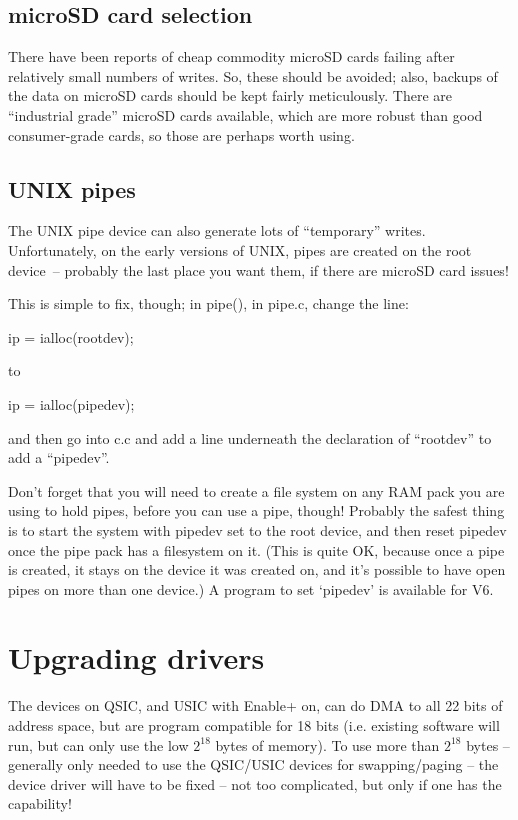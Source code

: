 \subsection{microSD card selection}

There have been reports of cheap commodity microSD cards failing after relatively
small numbers of writes. So, these should be avoided; also, backups of the
data on microSD cards should be kept fairly meticulously. There are ``industrial
grade'' microSD cards available, which are more robust than good consumer-grade
cards, so those are perhaps worth using.

\subsection{UNIX pipes}

The UNIX pipe device can also generate lots of ``temporary'' writes.
Unfortunately, on the early versions of UNIX, pipes are created on the root
device~-- probably the last place you want them, if there are microSD card issues!

This is simple to fix, though; in pipe(), in pipe.c, change the line:

	ip = ialloc(rootdev);

to

	ip = ialloc(pipedev);

and then go into c.c and add a line underneath the declaration of ``rootdev''
to add a ``pipedev''.

Don't forget that you will need to create a file system on any RAM pack you
are using to hold pipes, before you can use a pipe, though! Probably the
safest thing is to start the system with pipedev set to the root device, and
then reset pipedev once the pipe pack has a filesystem on it. (This is quite
OK, because once a pipe is created, it stays on the device it was created on,
and it's possible to have open pipes on more than one device.) A program to
set `pipedev' is available for V6.

\section{Upgrading drivers}

The devices on QSIC, and USIC with Enable+ on, can do DMA to all 22 bits of
address space, but are program compatible for 18 bits (i.e. existing software
will run, but can only use the low $2^{18}$ bytes of memory). To use more
than $2^{18}$ bytes -- generally only needed to use the QSIC/USIC devices for
swapping/paging -- the device driver will have to be fixed -- not too
complicated, but only if one has the capability!

